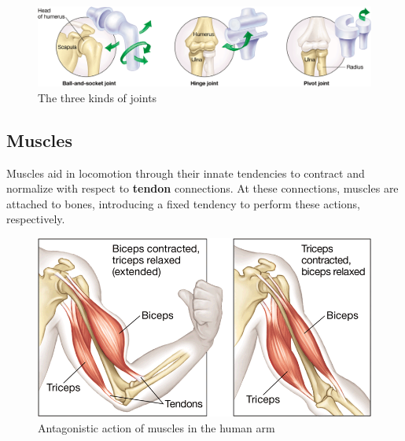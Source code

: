 \documentclass{article}
\begin{document}
\begin{figure}[h]
    \centering
    \includegraphics[width=\linewidth]{types_of_joints.png}
    \caption{The three kinds of joints}
\end{figure}

\subsection{Muscles}

Muscles aid in locomotion through their innate tendencies to contract and
normalize with respect to \textbf{tendon} connections. At these connections,
muscles are attached to bones, introducing a fixed tendency to perform these
actions, respectively.

\begin{figure}[h]
    \centering
    \includegraphics[width=0.7\linewidth]{muscle_action.png}
    \caption{Antagonistic action of muscles in the human arm}
\end{figure}
\end{document}
